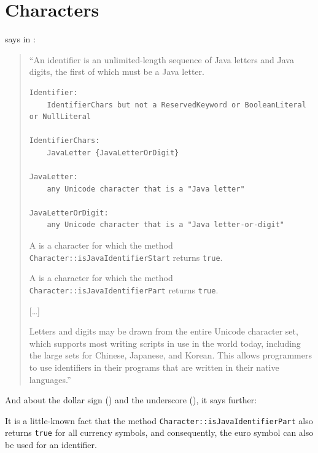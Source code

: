 \section{ Characters}
\jlsref says in \autocite{ORACLE_DOC_LANGUAGE_SPECIFICATION:Identifiers}:
\begin{quote}
``An identifier is an unlimited-length sequence of Java letters and Java digits, the first of which must be a Java letter.

\begin{lstlisting}[language={},numbers=none]
Identifier:
    IdentifierChars but not a ReservedKeyword or BooleanLiteral or NullLiteral

IdentifierChars:
    JavaLetter {JavaLetterOrDigit}

JavaLetter:
    any Unicode character that is a "Java letter"

JavaLetterOrDigit:
    any Unicode character that is a "Java letter-or-digit"
\end{lstlisting}

A  is a character for which the method\\ \lstinline|Character::isJavaIdentifierStart| returns \lstinline|true|.

A  is a character for which the method\\ \lstinline|Character::isJavaIdentifierPart| returns \lstinline|true|.

[…]

Letters and digits may be drawn from the entire Unicode character set, which supports most writing scripts in use in the world today, including the large sets for Chinese, Japanese, and Korean. This allows programmers to use identifiers in their programs that are written in their native languages.''
\end{quote}

And about the dollar sign (\bdq{\texttt{\$}}) and the underscore (\bdq{\texttt{\_}}), it says further:  

It is a little-known fact that the method \lstinline|Character::isJavaIdentifierPart| also returns \lstinline|true| for all currency symbols, and consequently, the euro symbol  can also be used for an identifier.

